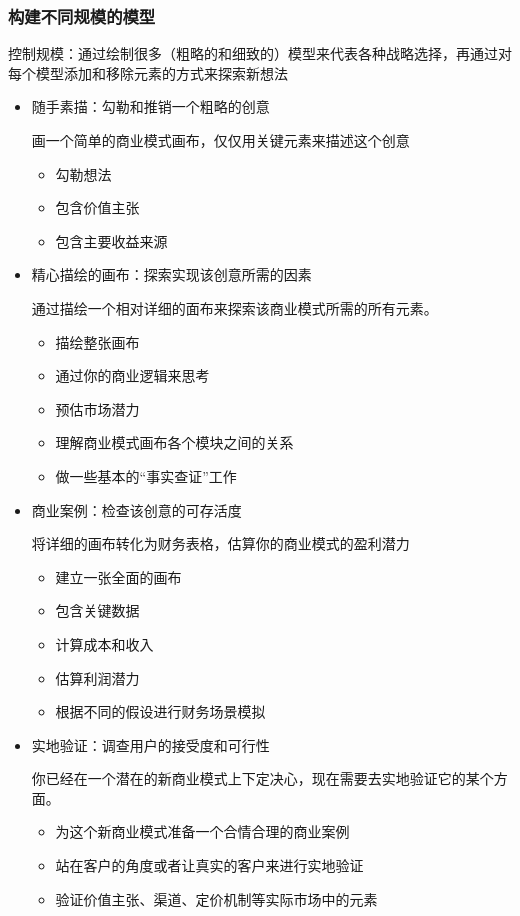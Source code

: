 \subsubsection{构建不同规模的模型}
控制规模：通过绘制很多（粗略的和细致的）模型来代表各种战略选择，再通过对每个模型添加和移除元素的方式来探索新想法
\begin{itemize}
    \item 随手素描：勾勒和推销一个粗略的创意
    
    画一个简单的商业模式画布，仅仅用关键元素来描述这个创意
    \begin{itemize}
        \item 勾勒想法
        \item 包含价值主张
        \item 包含主要收益来源
    \end{itemize}
    \item 精心描绘的画布：探索实现该创意所需的因素
    
    通过描绘一个相对详细的面布来探索该商业模式所需的所有元素。
    \begin{itemize}
        \item 描绘整张画布
        \item 通过你的商业逻辑来思考
        \item 预估市场潜力
        \item 理解商业模式画布各个模块之间的关系
        \item 做一些基本的“事实查证”工作
    \end{itemize}
    \item 商业案例：检查该创意的可存活度
    
    将详细的画布转化为财务表格，估算你的商业模式的盈利潜力
    \begin{itemize}
        \item 建立一张全面的画布
        \item 包含关键数据
        \item 计算成本和收入
        \item 估算利润潜力
        \item 根据不同的假设进行财务场景模拟
    \end{itemize}

    \item 实地验证：调查用户的接受度和可行性
    
    你已经在一个潜在的新商业模式上下定决心，现在需要去实地验证它的某个方面。
    \begin{itemize}
        \item 为这个新商业模式准备一个合情合理的商业案例
        \item 站在客户的角度或者让真实的客户来进行实地验证
        \item 验证价值主张、渠道、定价机制等实际市场中的元素
    \end{itemize}
\end{itemize}

